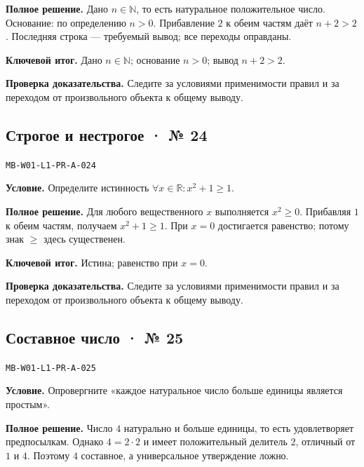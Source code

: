 \documentclass[11pt,a4paper,openany]{book}
\newcommand{\muid}[1]{\texttt{\footnotesize #1}}
\begin{document}
\textbf{Полное решение.} Дано $n\in\mathbb N$, то есть натуральное положительное число. Основание: по определению $n>0$. Прибавление $2$ к обеим частям даёт $n+2>2$. Последняя строка — требуемый вывод; все переходы оправданы.


\begin{learnbox}\textbf{Ключевой итог.} Дано $n\in\mathbb N$; основание $n>0$; вывод $n+2>2$.\par \textbf{Проверка доказательства.} 
Следите за условиями применимости правил и за переходом от произвольного объекта к общему выводу. 
\end{learnbox}

\subsection*{Строгое и нестрогое · № 24}\hypertarget{solution:MB-W01-L1-PR-A-024}{}

\muid{MB-W01-L1-PR-A-024}\par

\textbf{Условие.} Определите истинность $\forall x\in\mathbb R\colon x^2+1\ge1$.\par

\textbf{Полное решение.} Для любого вещественного $x$ выполняется $x^2\ge0$. Прибавляя $1$ к обеим частям, получаем $x^2+1\ge1$. При $x=0$ достигается равенство; потому знак $\ge$ здесь существенен.


\begin{learnbox}\textbf{Ключевой итог.} Истина; равенство при $x=0$.\par \textbf{Проверка доказательства.} 
Следите за условиями применимости правил и за переходом от произвольного объекта к общему выводу. 
\end{learnbox}

\subsection*{Составное число · № 25}\hypertarget{solution:MB-W01-L1-PR-A-025}{}

\muid{MB-W01-L1-PR-A-025}\par

\textbf{Условие.} Опровергните «каждое натуральное число больше единицы является простым».\par

\textbf{Полное решение.} Число $4$ натурально и больше единицы, то есть удовлетворяет предпосылкам. Однако $4=2\cdot2$ и имеет положительный делитель $2$, отличный от $1$ и $4$. Поэтому $4$ составное, а универсальное утверждение ложно.
\end{document}
